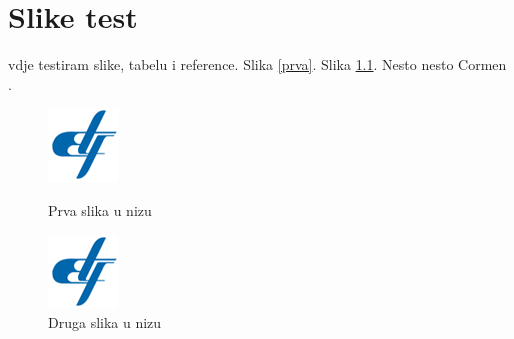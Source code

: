 \chapter{Slike test}
vdje testiram slike, tabelu i reference. Slika \ref{prva}. Slika \ref{druga}. Nesto nesto Cormen \cite{comer1976complexity}.

\begin{figure}
  \includegraphics[width=\linewidth]{images/etf-logo.png}
  \caption{Prva slika u nizu}
  \label{prva}
\endminipage\hfill
{}
  \includegraphics[width=\linewidth]{images/etf-logo.png}
  \caption{Druga slika u nizu}
  \label{druga}
\endminipage
\end{figure}

